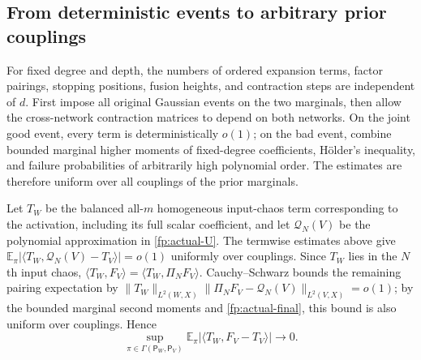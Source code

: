 \documentclass[a4paper]{tufte-handout}
\begin{document}
\begin{fullwidth}
\subsection{From deterministic events to arbitrary prior couplings}\label{fp:coupling-uniform}
For fixed degree and depth, the numbers of ordered expansion terms, factor pairings, stopping positions, fusion heights, and contraction steps are independent of $d$. First impose all original Gaussian events on the two marginals, then allow the cross-network contraction matrices to depend on both networks. On the joint good event, every term is deterministically $o(1)$; on the bad event, combine bounded marginal higher moments of fixed-degree coefficients, H\"older's inequality, and failure probabilities of arbitrarily high polynomial order. The estimates are therefore uniform over all couplings of the prior marginals.

Let $T_W$ be the balanced all-$m$ homogeneous input-chaos term corresponding to the activation, including its full scalar coefficient,
and let $\mathcal Q_N(V)$ be the polynomial approximation in \eqref{fp:actual-U}.
The termwise estimates above give $\mathbb E_\pi|\langle T_W,\mathcal Q_N(V)-T_V\rangle|=o(1)$ uniformly over couplings.
Since $T_W$ lies in the $N$th input chaos, $\langle T_W,F_V\rangle=\langle T_W,\Pi_NF_V\rangle$.
Cauchy--Schwarz bounds the remaining pairing expectation by
$\|T_W\|_{L^2(W,X)}\|\Pi_NF_V-\mathcal Q_N(V)\|_{L^2(V,X)}=o(1)$;
by the bounded marginal second moments and \eqref{fp:actual-final}, this bound is also uniform over couplings. Hence
\begin{equation}\label{fp:global-function-pairing}
 \boxed{\displaystyle
 \sup_{\pi\in\Gamma(\mathsf P_W,\mathsf P_V)}
 \mathbb E_\pi|\langle T_W,F_V-T_V\rangle|\longrightarrow0.}
\end{equation}


\end{fullwidth}
\end{document}

